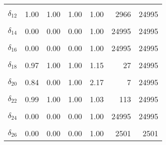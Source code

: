 \begin{table}
\begin{tabular}[t]{lrrrrrr}
\cellcolor{gray!6}{$\delta_{11}$} & \cellcolor{gray!6}{0.66} & \cellcolor{gray!6}{0.00} & \cellcolor{gray!6}{1.00} & \cellcolor{gray!6}{2.14} & \cellcolor{gray!6}{7} & \cellcolor{gray!6}{24995}\\
$\delta_{12}$ & 1.00 & 1.00 & 1.00 & 1.00 & 2966 & 24995\\
\cellcolor{gray!6}{$\delta_{13}$} & \cellcolor{gray!6}{0.72} & \cellcolor{gray!6}{0.00} & \cellcolor{gray!6}{1.00} & \cellcolor{gray!6}{2.02} & \cellcolor{gray!6}{7} & \cellcolor{gray!6}{24995}\\
$\delta_{14}$ & 0.00 & 0.00 & 0.00 & 1.00 & 24995 & 24995\\
\cellcolor{gray!6}{$\delta_{15}$} & \cellcolor{gray!6}{0.99} & \cellcolor{gray!6}{1.00} & \cellcolor{gray!6}{1.00} & \cellcolor{gray!6}{1.01} & \cellcolor{gray!6}{174} & \cellcolor{gray!6}{24995}\\
$\delta_{16}$ & 0.00 & 0.00 & 0.00 & 1.00 & 24995 & 24995\\
\cellcolor{gray!6}{$\delta_{17}$} & \cellcolor{gray!6}{0.58} & \cellcolor{gray!6}{0.00} & \cellcolor{gray!6}{1.00} & \cellcolor{gray!6}{2.11} & \cellcolor{gray!6}{7} & \cellcolor{gray!6}{24995}\\
$\delta_{18}$ & 0.97 & 1.00 & 1.00 & 1.15 & 27 & 24995\\
\cellcolor{gray!6}{$\delta_{19}$} & \cellcolor{gray!6}{0.00} & \cellcolor{gray!6}{0.00} & \cellcolor{gray!6}{0.00} & \cellcolor{gray!6}{1.00} & \cellcolor{gray!6}{24995} & \cellcolor{gray!6}{24995}\\
$\delta_{20}$ & 0.84 & 0.00 & 1.00 & 2.17 & 7 & 24995\\
\cellcolor{gray!6}{$\delta_{21}$} & \cellcolor{gray!6}{1.00} & \cellcolor{gray!6}{1.00} & \cellcolor{gray!6}{1.00} & \cellcolor{gray!6}{1.01} & \cellcolor{gray!6}{329} & \cellcolor{gray!6}{24995}\\
$\delta_{22}$ & 0.99 & 1.00 & 1.00 & 1.03 & 113 & 24995\\
\cellcolor{gray!6}{$\delta_{23}$} & \cellcolor{gray!6}{0.97} & \cellcolor{gray!6}{1.00} & \cellcolor{gray!6}{1.00} & \cellcolor{gray!6}{1.08} & \cellcolor{gray!6}{39} & \cellcolor{gray!6}{24995}\\
$\delta_{24}$ & 0.00 & 0.00 & 0.00 & 1.00 & 24995 & 24995\\
\cellcolor{gray!6}{$\delta_{25}$} & \cellcolor{gray!6}{1.00} & \cellcolor{gray!6}{1.00} & \cellcolor{gray!6}{1.00} & \cellcolor{gray!6}{1.00} & \cellcolor{gray!6}{661} & \cellcolor{gray!6}{24995}\\
$\delta_{26}$ & 0.00 & 0.00 & 0.00 & 1.00 & 2501 & 2501\\

\end{tabular}
\end{table}

